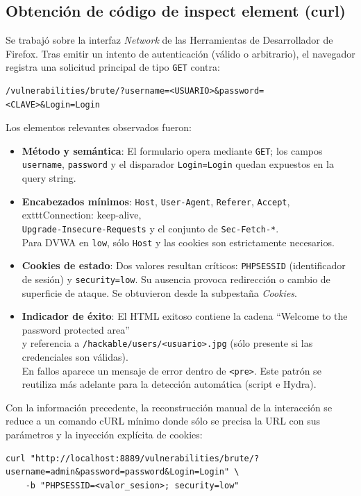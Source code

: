 \documentclass[letterpaper,12pt]{article}
\let\origsubsection\subsection
\renewcommand{\subsection}{\FloatBarrier\origsubsection}
\begin{document}
\subsection{Obtención de código de inspect element (curl)}
Se trabajó sobre la interfaz \emph{Network} de las Herramientas de Desarrollador de Firefox. Tras emitir un intento de autenticación (válido o arbitrario), el navegador registra una solicitud principal de tipo \texttt{GET} contra:
\begin{verbatim}
/vulnerabilities/brute/?username=<USUARIO>&password=<CLAVE>&Login=Login
\end{verbatim}
Los elementos relevantes observados fueron:
\begin{itemize}
        \item \textbf{Método y semántica}: El formulario opera mediante \texttt{GET}; los campos \texttt{username}, \texttt{password} y el disparador \texttt{Login=Login} quedan expuestos en la query string.
    \item \textbf{Encabezados mínimos}: \texttt{Host}, \texttt{User-Agent}, \texttt{Referer}, \texttt{Accept}, \\
    	exttt{Connection: keep-alive}, \\ \texttt{Upgrade-Insecure-Requests} y el conjunto de \texttt{Sec-Fetch-*}. \\
    Para DVWA en \texttt{low}, sólo \texttt{Host} y las cookies son estrictamente necesarios.
        \item \textbf{Cookies de estado}: Dos valores resultan críticos: \texttt{PHPSESSID} (identificador de sesión) y \texttt{security=low}. Su ausencia provoca redirección o cambio de superficie de ataque. Se obtuvieron desde la subpestaña \emph{Cookies}.
    \item \textbf{Indicador de éxito}: El HTML exitoso contiene la cadena ``Welcome to the password protected area'' \\
    y referencia a \texttt{/hackable/users/\allowbreak<usuario>.jpg} (sólo presente si las credenciales son válidas). \\
    En fallos aparece un mensaje de error dentro de \texttt{<pre>}. Este patrón se reutiliza más adelante para la detección automática (script e Hydra).
\end{itemize}
Con la información precedente, la reconstrucción manual de la interacción se reduce a un comando cURL mínimo donde sólo se precisa la URL con sus parámetros y la inyección explícita de cookies:
\begin{verbatim}
curl "http://localhost:8889/vulnerabilities/brute/?username=admin&password=password&Login=Login" \
    -b "PHPSESSID=<valor_sesion>; security=low"
\end{verbatim}
\end{document}
